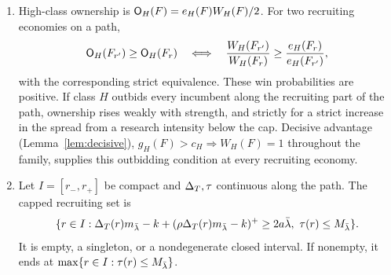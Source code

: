 \begin{proposition}
\begin{enumerate}[label=(\alph*),leftmargin=2em]
While the low class abstains or mixes, and after a sure sale becomes strictly profitable, respectively,
\[
 \frac{d\lambda_R}{d\DT}=
 \frac{m_{\lambda_R}}{2a-\DT m'_{\lambda_R}},\qquad
 \frac{d\lambda_R}{d\DT}=
 \frac{(1+\rho)m_{\lambda_R}}{2a-(1+\rho)\DT m'_{\lambda_R}}.
\]
If \((1-\rho)k/(2a\rho)<\lb\), these slopes meet with a strict upward jump at
\(\lambda_R=(1-\rho)k/(2a\rho)\). On an equilibrium path that passes through this intensity, a sure sale's
profit adds a second return to research. Research and entry are continuous through the first sale, the onset of
strictly profitable full selling, and the cap. The cap spread, at which research reaches its cap, is
\[
 \begin{cases}
 (2a\lb+k)/m_{\lb},&\lb\le(1-\rho)k/(2a\rho),\\
 (2a\lb+2k)/[(1+\rho)m_{\lb}],&\lb>(1-\rho)k/(2a\rho).
 \end{cases}
\]

\item High-class ownership is \(\mathsf{O}_H(F)=e_H(F)W_H(F)/2\). For two recruiting economies on a path,
\[
 \mathsf{O}_H(F_{r'})\ge\mathsf{O}_H(F_r)
 \quad\Longleftrightarrow\quad
 \frac{W_H(F_{r'})}{W_H(F_r)}\ge\frac{e_H(F_r)}{e_H(F_{r'})},
\]
with the corresponding strict equivalence. These win probabilities are positive. If class \(H\) outbids every
incumbent along the recruiting part of the path, ownership rises weakly with strength, and strictly for a strict
increase in the spread from a research intensity below the cap. Decisive advantage (Lemma~\ref{lem:decisive}),
\(g_H(F)>c_H\Longrightarrow W_H(F)=1\) throughout the family, supplies this outbidding condition at every
recruiting economy.

\item Let \(I=[r_-,r_+]\) be compact and \(\Delta_T,\tau\) continuous along the path. The capped recruiting set is
\[
 \{r\in I:\Delta_T(r)m_{\bar\lambda}-k+(\rho\Delta_T(r)m_{\bar\lambda}-k)^+\ge2a\bar\lambda,\ \tau(r)\le M_{\bar\lambda}\}.
\]
It is empty, a singleton, or a nondegenerate closed interval. If nonempty, it ends at
\(\max\{r\in I:\tau(r)\le M_{\bar\lambda}\}\).


\end{enumerate}
\end{proposition}
